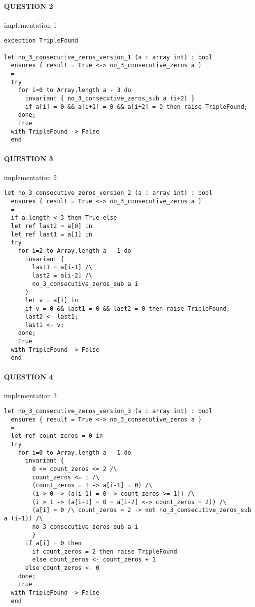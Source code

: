 \hypertarget{question-2}{%
\paragraph{QUESTION 2}\label{question-2}}

implementation 1

\begin{verbatim}
exception TripleFound

let no_3_consecutive_zeros_version_1 (a : array int) : bool
  ensures { result = True <-> no_3_consecutive_zeros a }
  =
  try
    for i=0 to Array.length a - 3 do
      invariant { no_3_consecutive_zeros_sub a (i+2) }
      if a[i] = 0 && a[i+1] = 0 && a[i+2] = 0 then raise TripleFound;
    done;
    True
  with TripleFound -> False
  end
\end{verbatim}

\hypertarget{question-3}{%
\paragraph{QUESTION 3}\label{question-3}}

implementation 2

\begin{verbatim}
let no_3_consecutive_zeros_version_2 (a : array int) : bool
  ensures { result = True <-> no_3_consecutive_zeros a }
  =
  if a.length < 3 then True else
  let ref last2 = a[0] in
  let ref last1 = a[1] in
  try
    for i=2 to Array.length a - 1 do
      invariant {
        last1 = a[i-1] /\
        last2 = a[i-2] /\
        no_3_consecutive_zeros_sub a i
      }
      let v = a[i] in
      if v = 0 && last1 = 0 && last2 = 0 then raise TripleFound;
      last2 <- last1;
      last1 <- v;
    done;
    True
  with TripleFound -> False
  end
\end{verbatim}

\hypertarget{question-4}{%
\paragraph{QUESTION 4}\label{question-4}}

implementation 3

\begin{verbatim}
let no_3_consecutive_zeros_version_3 (a : array int) : bool
  ensures { result = True <-> no_3_consecutive_zeros a }
  =
  let ref count_zeros = 0 in
  try
    for i=0 to Array.length a - 1 do
      invariant {
        0 <= count_zeros <= 2 /\
        count_zeros <= i /\
        (count_zeros = 1 -> a[i-1] = 0) /\
        (i > 0 -> (a[i-1] = 0 -> count_zeros >= 1)) /\
        (i > 1 -> (a[i-1] = 0 = a[i-2] <-> count_zeros = 2)) /\
        (a[i] = 0 /\ count_zeros = 2 -> not no_3_consecutive_zeros_sub a (i+1)) /\
        no_3_consecutive_zeros_sub a i
        }
      if a[i] = 0 then
        if count_zeros = 2 then raise TripleFound
        else count_zeros <- count_zeros + 1
      else count_zeros <- 0
    done;
    True
  with TripleFound -> False
  end
\end{verbatim}

